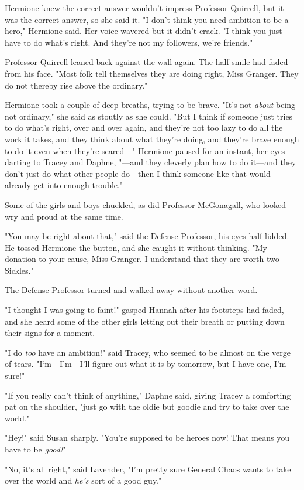 Hermione knew the correct answer wouldn't impress Professor Quirrell, but it
was the correct answer, so she said it. "I don't think you need ambition to be
a hero," Hermione said. Her voice wavered but it didn't crack. "I think you
just have to do what's right. And they're not my followers, we're friends."

Professor Quirrell leaned back against the wall again. The half-smile had faded
from his face. "Most folk tell themselves they are doing right, Miss Granger.
They do not thereby rise above the ordinary."

Hermione took a couple of deep breaths, trying to be brave. "It's not
\emph{about} being not ordinary," she said as stoutly as she could. "But I
think if someone just tries to do what's right, over and over again, and
they're not too lazy to do all the work it takes, and they think about what
they're doing, and they're brave enough to do it even when they're scared---"
Hermione paused for an instant, her eyes darting to Tracey and Daphne, "---and
they cleverly plan how to do it---and they don't just do what other people
do---then I think someone like that would already get into enough trouble."

Some of the girls and boys chuckled, as did Professor McGonagall, who looked
wry and proud at the same time.

"You may be right about that," said the Defense Professor, his eyes
half-lidded. He tossed Hermione the button, and she caught it without thinking.
"My donation to your cause, Miss Granger. I understand that they are worth two
Sickles."

The Defense Professor turned and walked away without another word.

"I thought I was going to faint!" gasped Hannah after his footsteps had faded,
and she heard some of the other girls letting out their breath or putting down
their signs for a moment.

"I do \emph{too} have an ambition!" said Tracey, who seemed to be almost on the
verge of tears. "I`m---I'm---I'll figure out what it is by tomorrow, but I have
one, I'm sure!"

"If you really can't think of anything," Daphne said, giving Tracey a
comforting pat on the shoulder, "just go with the oldie but goodie and try to
take over the world."

"Hey!" said Susan sharply. "You're supposed to be heroes now! That means you
have to be \emph{good!}"

"No, it's all right," said Lavender, "I'm pretty sure General Chaos wants to
take over the world and \emph{he's} sort of a good guy."

